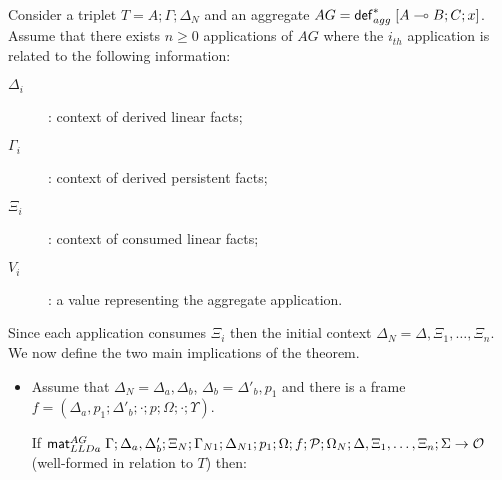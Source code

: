\begin{theorem}\label{thm:multiple_aggregate_derivation}
Consider a triplet $T = A; \Gamma; \Delta_{N}$ and an aggregate $AG =
\mathsf{def}_{agg}^{*} \; [A \multimap B ; C; x]$. Assume that there exists $n \geq 0$ applications of $AG$
where the $i_{th}$ application is related to the following information:
\begin{description}
   \item[$\Delta_i$]: context of derived linear facts;
   \item[$\Gamma_i$]: context of derived persistent facts;
   \item[$\Xi_i$]: context of consumed linear facts;
   \item[$V_i$]: a value representing the aggregate application.
\end{description}

Since each application consumes $\Xi_i$ then the initial context $\Delta_N =
\Delta, \Xi_1, \dotsc, \Xi_n$. We now define the two main implications of the
theorem.

\begin{itemize}[leftmargin=*]
   \item Assume that $\Delta_N = \Delta_a, \Delta_b$, $\Delta_b =
   \Delta'_b, p_1$ and there is a frame $f = (\Delta_a, p_1; \Delta'_b; \cdot;
         p; \Omega; \cdot; \Upsilon)$.

   If $\mathsf{mat}_{LLDa}^{AG} \; \Gamma; \Delta_a, \Delta'_b; \Xi_N; \Gamma_{N1}; \Delta_{N1};
      p_1; \Omega; f; \mathcal{P}; \Omega_N; \Delta, \Xi_1, \dotsc, \Xi_n;
      \Sigma \rightarrow \mathcal{O}$ (well-formed in relation to $T$) then:


\end{itemize}
\end{theorem}
